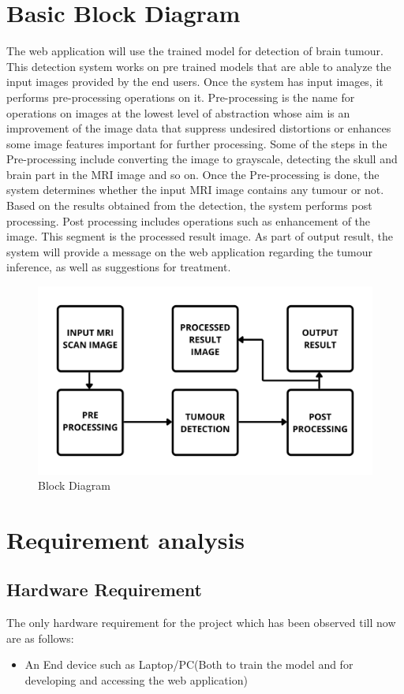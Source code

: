 \section{Basic Block Diagram}
The web application will use the trained model for detection of brain tumour. This detection system works on pre trained models that are able to analyze the input images provided by the end users. Once the system has input images, it performs pre-processing operations on it. Pre-processing is the name for operations on images at the lowest level of abstraction whose aim is an improvement of the image data that suppress undesired distortions or enhances some image features important for further processing. Some of the steps in the Pre-processing include converting the image to grayscale, detecting the skull and brain part in the MRI image and so on. Once the Pre-processing is done, the system determines whether the input MRI image contains any tumour or not. Based on the results obtained from the detection, the system performs post processing. Post processing includes operations such as enhancement of the image. This segment is the processed result image. As part of output result, the system will provide a message on the web application regarding the tumour inference, as well as suggestions for treatment.
\begin{figure}[H]
\includegraphics[scale=0.2]{Photos/blockdiagram.png}
\caption{Block Diagram} \label{fig:ishan}
\end{figure}
\section{Requirement analysis}
\subsection{Hardware Requirement}
The only hardware requirement for the project which has been observed till now are as follows:
\begin{itemize}
    \item An End device such as Laptop/PC(Both to train the model and for developing and accessing the web application)
\end{itemize}
